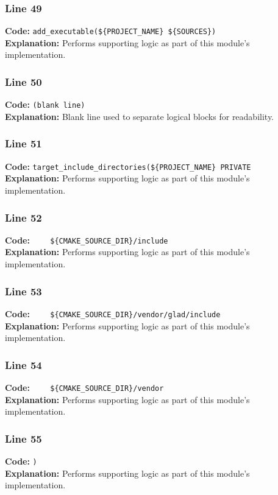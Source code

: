\documentclass[11pt,a4paper]{article}
\begin{document}
\subsubsection*{Line 49}
\textbf{Code:} \verb|add_executable(${PROJECT_NAME} ${SOURCES})|\\
\textbf{Explanation:} Performs supporting logic as part of this module's implementation.

\subsubsection*{Line 50}
\textbf{Code:} \texttt{(blank line)}\\
\textbf{Explanation:} Blank line used to separate logical blocks for readability.

\subsubsection*{Line 51}
\textbf{Code:} \verb|target_include_directories(${PROJECT_NAME} PRIVATE|\\
\textbf{Explanation:} Performs supporting logic as part of this module's implementation.

\subsubsection*{Line 52}
\textbf{Code:} \verb|    ${CMAKE_SOURCE_DIR}/include|\\
\textbf{Explanation:} Performs supporting logic as part of this module's implementation.

\subsubsection*{Line 53}
\textbf{Code:} \verb|    ${CMAKE_SOURCE_DIR}/vendor/glad/include|\\
\textbf{Explanation:} Performs supporting logic as part of this module's implementation.

\subsubsection*{Line 54}
\textbf{Code:} \verb|    ${CMAKE_SOURCE_DIR}/vendor|\\
\textbf{Explanation:} Performs supporting logic as part of this module's implementation.

\subsubsection*{Line 55}
\textbf{Code:} \verb|)|\\
\textbf{Explanation:} Performs supporting logic as part of this module's implementation.
\end{document}
